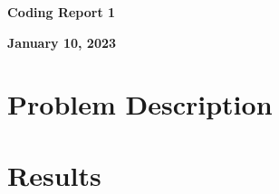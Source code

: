 \documentclass[a4paper,12pt]{article}
\begin{document}
\begin{center} %
	{\Large \bf Coding Report 1} %
	\vspace{2mm}
	
       
	{\bf January 10, 2023}
\end{center}  

\vspace{0.4cm}


\section{Problem Description}

\section{Results}
\end{document}
